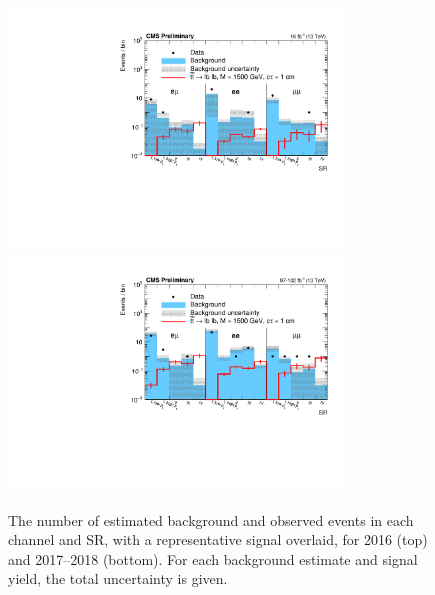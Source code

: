 \begin{figure}[hbtp]
\centering
\includegraphics[width=0.8\textwidth]{figures/results/SR2016yields_CMSPreliminary.pdf}
\includegraphics[width=0.8\textwidth]{figures/results/SR201718yields_CMSPreliminary.pdf}
\caption{The number of estimated background and observed events in each channel and SR, with a representative signal overlaid, for 2016 (top) and 2017--2018 (bottom). For each background estimate and signal yield, the total uncertainty is given.}
\label{yields_figure}
\end{figure}